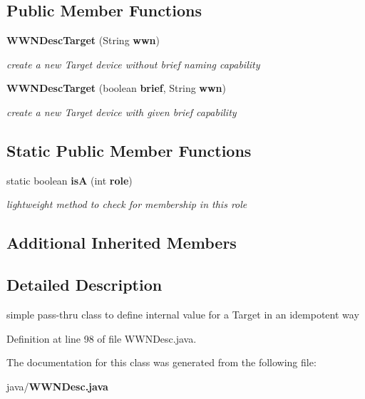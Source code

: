 \subsection*{Public Member Functions}
\begin{DoxyCompactItemize}
\item 
{\bf W\+W\+N\+Desc\+Target} (String {\bf wwn})\label{classorg_1_1smallfoot_1_1wwn_1_1WWNDesc_1_1WWNDescTarget_a01442752a1408c8166fca29e90f0fa7c}

\begin{DoxyCompactList}\small\item\em create a new Target device without brief naming capability \end{DoxyCompactList}\item 
{\bf W\+W\+N\+Desc\+Target} (boolean {\bf brief}, String {\bf wwn})\label{classorg_1_1smallfoot_1_1wwn_1_1WWNDesc_1_1WWNDescTarget_a2ce2a4aa1713c0f1184774f236fe50e5}

\begin{DoxyCompactList}\small\item\em create a new Target device with given brief capability \end{DoxyCompactList}\end{DoxyCompactItemize}
\subsection*{Static Public Member Functions}
\begin{DoxyCompactItemize}
\item 
static boolean {\bf is\+A} (int {\bf role})\label{classorg_1_1smallfoot_1_1wwn_1_1WWNDesc_1_1WWNDescTarget_a6530bfb83544e64d2c13e7f32784eff2}

\begin{DoxyCompactList}\small\item\em lightweight method to check for membership in this role \end{DoxyCompactList}\end{DoxyCompactItemize}
\subsection*{Additional Inherited Members}


\subsection{Detailed Description}
simple pass-\/thru class to define internal value for a Target in an idempotent way 

Definition at line 98 of file W\+W\+N\+Desc.\+java.



The documentation for this class was generated from the following file\+:\begin{DoxyCompactItemize}
\item 
java/{\bf W\+W\+N\+Desc.\+java}\end{DoxyCompactItemize}
